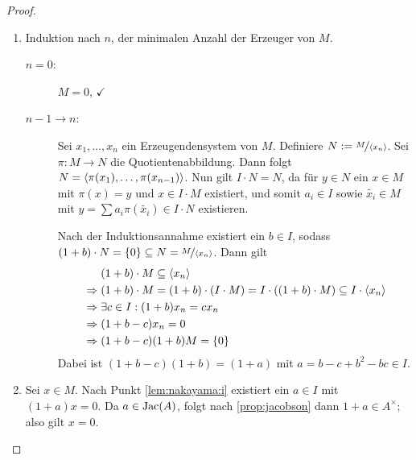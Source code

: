 \documentclass[12pt,a4paper]{scrartcl}
\theoremstyle{cplain}
\theoremstyle{cdef}
\begin{document}
\begin{proof}
	\leavevmode
	\begin{enumerate}[label=\ref{lem:nakayama:\roman*}]
		\item Induktion nach $n$, der minimalen Anzahl der Erzeuger von $M$.
        \begin{description}
            \item[$n = 0$:] $M = 0$, $\checkmark$
            \item[$n-1\to n$:] Sei $x_1,\dots, x_n$ ein Erzeugendensystem von $M$. Definiere $N := \nicefrac{M}{\langle x_n\rangle}$. Sei $\pi \colon M\to N$ die Quotientenabbildung. Dann folgt $N = \langle\pi(x_1),\dots,\pi(x_{n-1})\rangle$. Nun gilt $I\cdot N = N$, da für $y\in N$ ein $x\in M$ mit $\pi(x) = y$ und $x\in I\cdot M$ existiert, und somit $a_i\in I$ sowie $\tilde{x_i}\in M$ mit $y =\sum a_i\pi(\tilde{x_i})\in I\cdot N$ existieren.
		
            Nach der Induktionsannahme existiert ein $b\in I$, sodass $(1+b)\cdot N = \{0\}\subseteq N = \nicefrac{M}{\langle x_n\rangle}$. Dann gilt
            \begin{align*}
                &\phantom{{}\Rightarrow{}}(1+b)\cdot M\subseteq \<x_n\>\\
                &\Rightarrow (1+b)\cdot M = (1+b)\cdot (I\cdot M) = I\cdot((1+b)\cdot M)\subseteq I \cdot \<x_n\>\\
                &\Rightarrow \exists c\in I: (1+b) x_n = cx_n \\
                &\Rightarrow (1+b-c)x_n = 0\\
                &\Rightarrow (1+b-c)(1+b)M = \{0\}
            \end{align*}
            Dabei ist $(1+b-c)(1+b) = (1+a)$ mit $a = b-c+b^2-bc\in I$.
        \end{description}
        \item Sei $x\in M$. Nach Punkt \ref{lem:nakayama:i} existiert ein $a\in I$ mit $(1+a)x = 0$. Da $a\in \operatorname{Jac}(A)$, folgt nach \cref{prop:jacobson} dann $1+a\in A^{\times}$; also gilt $x = 0$.
        \qedhere
	\end{enumerate}
\end{proof}

\end{document}
